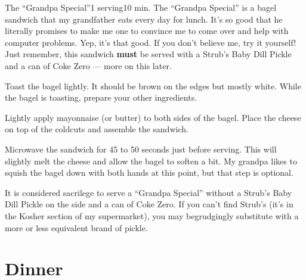 \begin{recipe}{The \enquote{Grandpa Special}}{1 serving}{10 min.}
\freeform The \enquote{Grandpa Special} is a bagel sandwich that my grandfather
eats every day for lunch. It's so good that he literally promises to make me one
to convince me to come over and help with computer problems. Yep, it's that
good.  If you don't believe me, try it yourself!  Just remember, this sandwich
\textbf{must} be served with a Strub's Baby Dill Pickle and a can of Coke Zero
---  more on this later.

Toast the bagel lightly. It should be brown on the edges but mostly white.
While the bagel is toasting, prepare your other ingredients.

Lightly apply mayonnaise (or butter) to both sides of the bagel. Place the
cheese on top of the coldcuts and assemble the sandwich.

\newstep Microwave the sandwich for 45 to 50 seconds just before serving.
This will slightly melt the cheese and allow the bagel to soften a bit.
My grandpa likes to squish the bagel down with both hands at this point,
but that step is optional.

It is considered sacrilege to serve a \enquote{Grandpa Special} without
a Strub's Baby Dill Pickle on the side and a can of Coke Zero. If you can't find
Strub's (it's in the Kosher section of my supermarket), you may begrudgingly
substitute with a more or less equivalent brand of pickle.
\end{recipe}

\section{Dinner}
\label{sec:findlay-dinner}

